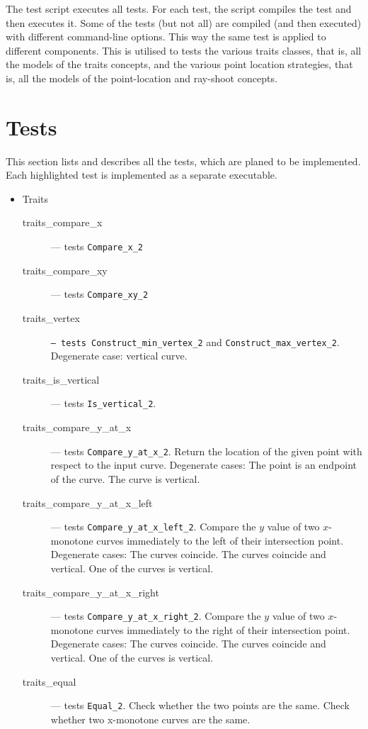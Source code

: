 \documentclass[11pt,a4paper]{article}
\begin{document}
The test script executes all tests. For each test, the script compiles the
test and then executes it. Some of the tests (but not all) are compiled (and
then executed) with different command-line options. This way the same test is
applied to different components. This is utilised to tests the various traits
classes, that is, all the models of the traits concepts, and the various point
location strategies, that is, all the models of the point-location and
ray-shoot concepts.
%
\section{Tests}
This section lists and describes all the tests, which are planed to be
implemented. Each highlighted test is implemented as a separate
executable.
\begin{itemize}
\item Traits
  \begin{description}
  \item[traits\_compare\_x] --- tests {\tt Compare\_x\_2}
  \item[traits\_compare\_xy] --- tests {\tt Compare\_xy\_2}
  \item[traits\_vertex] {\tt --- tests Construct\_min\_vertex\_2} and
    {\tt Construct\_max\_vertex\_2}. Degenerate case: vertical curve.
  \item[traits\_is\_vertical] --- tests {\tt Is\_vertical\_2}.
  \item[traits\_compare\_y\_at\_x] --- tests {\tt Compare\_y\_at\_x\_2}.
    Return the location of the given point with respect to the input curve.
    Degenerate cases: The point is an endpoint of the curve. The curve
    is vertical.
  \item[traits\_compare\_y\_at\_x\_left] --- tests
    {\tt Compare\_y\_at\_x\_left\_2}. Compare the $y$ value of two
    $x$-monotone curves immediately to the left of their intersection
    point. Degenerate cases: The curves coincide. The curves coincide
    and vertical. One of the curves is vertical.
  \item[traits\_compare\_y\_at\_x\_right] --- tests
    {\tt Compare\_y\_at\_x\_right\_2}. Compare the $y$ value of two
    $x$-monotone curves immediately to the right of their intersection
    point. Degenerate cases: The curves coincide. The curves coincide
    and vertical. One of the curves is vertical.
  \item[traits\_equal] --- tests {\tt Equal\_2}. Check whether the two
  points are the same. Check whether two x-monotone curves are the same.
  \end{description}


\end{itemize}
\end{document}
